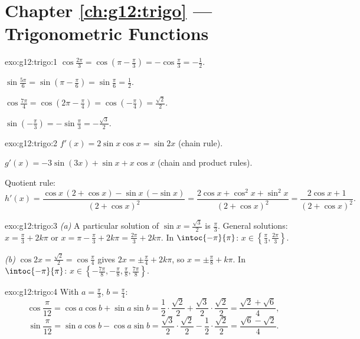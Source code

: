 \section*{Chapter \ref{ch:g12:trigo} --- Trigonometric Functions}

\begin{solution}{exo:g12:trigo:1}
$\cos\frac{2\pi}{3} = \cos\left(\pi - \frac\pi3\right) = -\cos\frac\pi3
= -\frac12$.

$\sin\frac{5\pi}{6} = \sin\left(\pi - \frac\pi6\right) = \sin\frac\pi6
= \frac12$.

$\cos\frac{7\pi}{4} = \cos\left(2\pi - \frac{\pi}{4}\right)
= \cos\left(-\frac\pi4\right) = \frac{\sqrt2}{2}$.

$\sin\left(-\frac\pi3\right) = -\sin\frac\pi3 = -\frac{\sqrt3}{2}$.
\end{solution}

\begin{solution}{exo:g12:trigo:2}
$f'(x) = 2\sin x\cos x = \sin 2x$ (chain rule).

$g'(x) = -3\sin(3x) + \sin x + x\cos x$ (chain and product rules).

Quotient rule:
\[
h'(x) = \frac{\cos x\,(2 + \cos x) - \sin x\,(-\sin x)}{(2+\cos x)^2}
= \frac{2\cos x + \cos^2 x + \sin^2 x}{(2+\cos x)^2}
= \frac{2\cos x + 1}{(2+\cos x)^2}.
\]
\end{solution}

\begin{solution}{exo:g12:trigo:3}
\emph{(a)} A particular solution of $\sin x = \frac{\sqrt3}{2}$ is
$\frac\pi3$. General solutions: $x = \frac\pi3 + 2k\pi$ or
$x = \pi - \frac\pi3 + 2k\pi = \frac{2\pi}{3} + 2k\pi$. In
$\intoc{-\pi}{\pi}$: $x \in \left\{\frac\pi3, \frac{2\pi}{3}\right\}$.

\emph{(b)} $\cos 2x = \frac{\sqrt2}{2} = \cos\frac\pi4$ gives
$2x = \pm\frac\pi4 + 2k\pi$, so $x = \pm\frac\pi8 + k\pi$. In
$\intoc{-\pi}{\pi}$:
$x \in \left\{-\frac{7\pi}{8}, -\frac\pi8, \frac\pi8, \frac{7\pi}{8}\right\}$.
\end{solution}

\begin{solution}{exo:g12:trigo:4}
With $a = \frac\pi3$, $b = \frac\pi4$:
\[
\cos\frac{\pi}{12} = \cos a\cos b + \sin a \sin b
= \frac12\cdot\frac{\sqrt2}{2} + \frac{\sqrt3}{2}\cdot\frac{\sqrt2}{2}
= \frac{\sqrt2 + \sqrt6}{4},
\]
\[
\sin\frac{\pi}{12} = \sin a\cos b - \cos a \sin b
= \frac{\sqrt3}{2}\cdot\frac{\sqrt2}{2} - \frac12\cdot\frac{\sqrt2}{2}
= \frac{\sqrt6 - \sqrt2}{4}.
\]
\end{solution}

